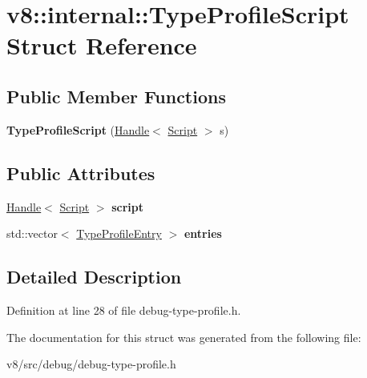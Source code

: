 \hypertarget{structv8_1_1internal_1_1TypeProfileScript}{}\section{v8\+:\+:internal\+:\+:Type\+Profile\+Script Struct Reference}
\label{structv8_1_1internal_1_1TypeProfileScript}
\subsection*{Public Member Functions}
\begin{DoxyCompactItemize}
\item 
\mbox{\label{structv8_1_1internal_1_1TypeProfileScript_af5f469ff312722ee07bf5c4659c8fe3b}} 
{\bfseries Type\+Profile\+Script} (\mbox{\hyperlink{classv8_1_1internal_1_1Handle}{Handle}}$<$ \mbox{\hyperlink{classv8_1_1internal_1_1Script}{Script}} $>$ s)
\end{DoxyCompactItemize}
\subsection*{Public Attributes}
\begin{DoxyCompactItemize}
\item 
\mbox{\label{structv8_1_1internal_1_1TypeProfileScript_a5e56cc28e35e9d42f34d3f2767881ed4}} 
\mbox{\hyperlink{classv8_1_1internal_1_1Handle}{Handle}}$<$ \mbox{\hyperlink{classv8_1_1internal_1_1Script}{Script}} $>$ {\bfseries script}
\item 
\mbox{\label{structv8_1_1internal_1_1TypeProfileScript_a7cfa4dcaab5018c36393e5abcae8ba10}} 
std\+::vector$<$ \mbox{\hyperlink{structv8_1_1internal_1_1TypeProfileEntry}{Type\+Profile\+Entry}} $>$ {\bfseries entries}
\end{DoxyCompactItemize}


\subsection{Detailed Description}


Definition at line 28 of file debug-\/type-\/profile.\+h.



The documentation for this struct was generated from the following file\+:\begin{DoxyCompactItemize}
\item 
v8/src/debug/debug-\/type-\/profile.\+h\end{DoxyCompactItemize}
